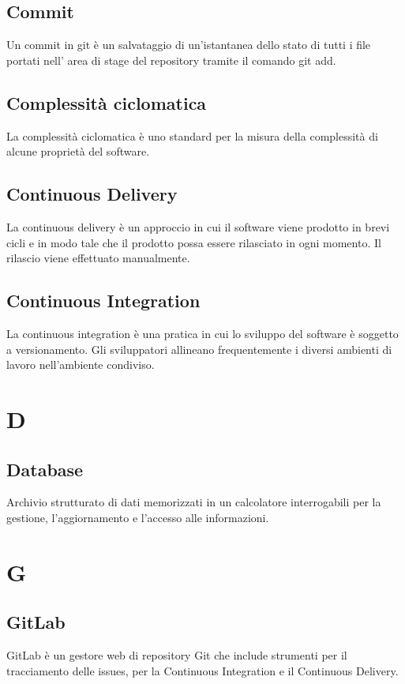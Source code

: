	\subsection{Commit}
	Un commit in git è un salvataggio di un'istantanea dello stato di tutti i file portati nell' area di stage del repository tramite il comando git add.
	
	\subsection{Complessità ciclomatica}
	La complessità ciclomatica è uno standard per la misura della complessità di alcune proprietà del software.
	\subsection{Continuous Delivery}
	La continuous delivery è un approccio in cui il software viene prodotto in brevi cicli e in modo tale che il prodotto possa essere rilasciato in ogni momento. Il rilascio viene effettuato manualmente.
	
	\subsection{Continuous Integration}
	La continuous integration è una pratica in cui lo sviluppo del software è soggetto a versionamento. Gli sviluppatori allineano frequentemente i diversi ambienti di lavoro nell'ambiente condiviso.
	
	\section{D}
	\subsection{Database}
	Archivio strutturato di dati memorizzati in un calcolatore interrogabili per la gestione, l'aggiornamento e l'accesso alle informazioni.
	
	\section{G}
	\subsection{GitLab} 
	GitLab è un gestore web di repository Git che include strumenti per il tracciamento delle issues, per la Continuous Integration e il Continuous Delivery.
	
